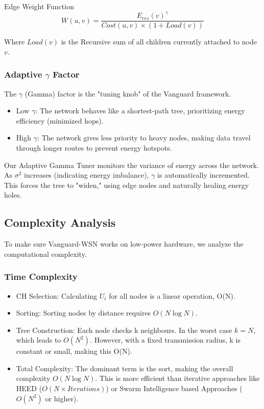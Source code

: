 \documentclass[conference]{IEEEtran}
\begin{document}
Edge Weight Function
\begin{equation}
W(u, v) = \frac{E_{res}(v)^\gamma}{Cost(u, v) \times (1 + Load(v))}
\end{equation}

Where $Load(v)$ is the Recursive sum of all children currently attached to node $v$.

\subsubsection{Adaptive $\gamma$ Factor}
The $\gamma$ (Gamma) factor is the "tuning knob" of the Vanguard framework.
\begin{itemize}
    \item Low $\gamma$: The network behaves like a shortest-path tree, prioritizing energy efficiency (minimized hops).
    \item High $\gamma$: The network gives less priority to heavy nodes, making data travel through longer routes to prevent energy hotspots.
\end{itemize}

Our Adaptive Gamma Tuner monitors the variance of energy across the network. As $\sigma^2$ increases (indicating energy imbalance), $\gamma$ is automatically incremented. This forces the tree to "widen," using edge nodes and naturally healing energy holes.

\subsection{Complexity Analysis}
To make sure Vanguard-WSN works on low-power hardware, we analyze the computational complexity.

\subsubsection{Time Complexity}
\begin{itemize}
    \item CH Selection: Calculating $U_i$ for all nodes is a linear operation, O(N).
    \item Sorting: Sorting nodes by distance requires $O(N \log N)$.
    \item Tree Construction: Each node checks k neighbours. In the worst case $k=N$, which leads to $O(N^2)$. However, with a fixed transmission radius, k is constant or small, making this O(N).
    \item Total Complexity: The dominant term is the sort, making the overall complexity $O(N \log N)$. This is more efficient than iterative approaches like HEED ($O(N \times Iterations)$) or Swarm Intelligence based Approaches ($O(N^2)$ or higher).
\end{itemize}
\end{document}
